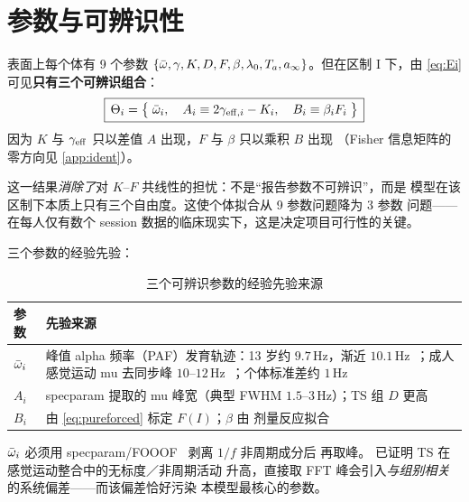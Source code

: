\section{参数与可辨识性}
\label{sec:identifiability}

表面上每个体有 9 个参数
$\{\bar{\omega},\gamma,K,D,F,\beta,\lambda_0,T_a,a_\infty\}$。但在区制 I 下，由
\cref{eq:Ei} 可见\textbf{只有三个可辨识组合}：
%
\begin{equation}\label{eq:ident}
\boxed{\,\Theta_i=\bigl\{\;\bar{\omega}_i,\quad
       A_i\equiv2\gamma_{\mathrm{eff},i}-K_i,\quad
       B_i\equiv\beta_iF_i\;\bigr\}\,}
\end{equation}
%
因为 $K$ 与 $\gamma_{\mathrm{eff}}$ 只以差值 $A$ 出现，$F$ 与 $\beta$ 只以乘积 $B$ 出现
（Fisher 信息矩阵的零方向见 \cref{app:ident}）。

\begin{remark}[决定项目可行性的结果]\label{rem:identgood}
这一结果\emph{消除了}对 $K$--$F$ 共线性的担忧：不是“报告参数不可辨识”，而是
模型在该区制下本质上只有三个自由度。这使个体拟合从 9 参数问题降为 3 参数
问题——在每人仅有数个 session 数据的临床现实下，这是决定项目可行性的关键。
\end{remark}

三个参数的经验先验：

\begin{table}[htbp]
\centering
\caption{三个可辨识参数的经验先验来源}
\label{tab:priors}
\small
\begin{tabularx}{\textwidth}{@{}l X@{}}
\toprule
参数 & 先验来源 \\
\midrule
$\bar{\omega}_i$ & 峰值 alpha 频率（PAF）发育轨迹：13 岁约 $9.7\,$Hz，渐近
            $10.1\,$Hz~\citep{Cellier2022}；成人感觉运动 mu 去同步峰
            $10$–$12\,$Hz~\citep{Berchicci2011}；个体标准差约 $1\,$Hz \\
$A_i$     & specparam 提取的 mu 峰宽（典型 FWHM $1.5$–$3\,$Hz）；TS 组 $D$ 更高 \\
$B_i$     & 由 \cref{eq:pureforced} 标定 $F(I)$；$\beta$ 由 \TPM{} 剂量反应拟合 \\
\bottomrule
\end{tabularx}
\end{table}

\begin{remark}\label{rem:fooof}
$\bar{\omega}_i$ 必须用 specparam/FOOOF~\citep{Donoghue2020} 剥离 $1/f$ 非周期成分后
再取峰。\citet{Adelhofer2021} 已证明 TS 在感觉运动整合中的无标度／非周期活动
升高，直接取 FFT 峰会引入\emph{与组别相关}的系统偏差——而该偏差恰好污染
本模型最核心的参数。
\end{remark}

